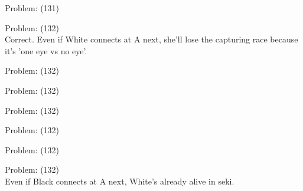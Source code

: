 \documentclass[11pt]{article}
\begin{document}
\begin{minipage}[t]{0.5\textwidth}
  {\centering
  
Problem: (131)\\
  }
\end{minipage}
\begin{minipage}[t]{0.5\textwidth}
  {\centering
  
Problem: (132)\\
Correct. Even if White connects at A next, she'll lose the capturing race because it's 'one eye vs no eye'.\\
  }
\end{minipage}
\begin{minipage}[t]{0.5\textwidth}
  {\centering
  
Problem: (132)\\
  }
\end{minipage}
\begin{minipage}[t]{0.5\textwidth}
  {\centering
  
Problem: (132)\\
  }
\end{minipage}
\begin{minipage}[t]{0.5\textwidth}
  {\centering
  
Problem: (132)\\
  }
\end{minipage}
\begin{minipage}[t]{0.5\textwidth}
  {\centering
  
Problem: (132)\\
  }
\end{minipage}
\begin{minipage}[t]{0.5\textwidth}
  {\centering
  
Problem: (132)\\
  }
\end{minipage}
\begin{minipage}[t]{0.5\textwidth}
  {\centering
  
Problem: (132)\\
Even if Black connects at A next, White's already alive in seki.\\
  }
\end{minipage}
\end{document}
